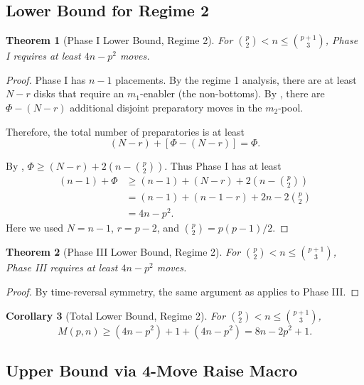 \documentclass[11pt]{article}
\newtheorem{theorem}{Theorem}
\newtheorem{corollary}[theorem]{Corollary}
\theoremstyle{definition}
\begin{document}
\subsection{Lower Bound for Regime 2}

\begin{theorem}[Phase I Lower Bound, Regime 2]\label{thm:phase1-lower-regime2}
For $\binom{p}{2} < n \leq \binom{p+1}{3}$, Phase I requires at least $4n - p^2$ moves.
\end{theorem}

\begin{proof}
Phase I has $n-1$ placements. By the regime 1 analysis, there are at least $N - r$ disks that require an $m_1$-enabler (the non-bottoms). By , there are $\Phi - (N-r)$ additional disjoint preparatory moves in the $m_2$-pool.

Therefore, the total number of preparatories is at least
\[
(N - r) + [\Phi - (N - r)] = \Phi.
\]

By , $\Phi \geq (N-r) + 2(n - \binom{p}{2})$. Thus Phase I has at least
\begin{align*}
(n-1) + \Phi &\geq (n-1) + (N-r) + 2\left(n - \binom{p}{2}\right) \\
&= (n-1) + (n-1-r) + 2n - 2\binom{p}{2} \\
&= 4n - p^2.
\end{align*}
Here we used $N = n-1$, $r = p-2$, and $\binom{p}{2} = p(p-1)/2$.
\end{proof}

\begin{theorem}[Phase III Lower Bound, Regime 2]\label{thm:phase3-lower-regime2}
For $\binom{p}{2} < n \leq \binom{p+1}{3}$, Phase III requires at least $4n - p^2$ moves.
\end{theorem}

\begin{proof}
By time-reversal symmetry, the same argument as  applies to Phase III.
\end{proof}

\begin{corollary}[Total Lower Bound, Regime 2]\label{cor:lower-regime2}
For $\binom{p}{2} < n \leq \binom{p+1}{3}$,
\[
M(p,n) \geq (4n - p^2) + 1 + (4n - p^2) = 8n - 2p^2 + 1.
\]
\end{corollary}

\subsection{Upper Bound via 4-Move Raise Macro}
\end{document}
